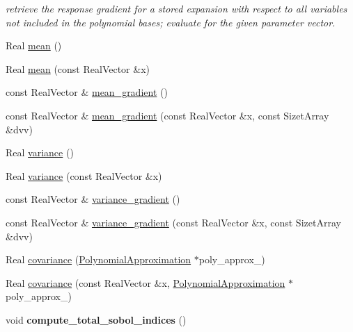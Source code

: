 \begin{DoxyCompactItemize}
\begin{DoxyCompactList}\small\item\em retrieve the response gradient for a stored expansion with respect to all variables not included in the polynomial bases; evaluate for the given parameter vector. \end{DoxyCompactList}\item 
Real \hyperlink{classPecos_1_1NodalInterpPolyApproximation_adc6f262952d05a33ff68cae37929cbb2}{mean} ()
\item 
Real \hyperlink{classPecos_1_1NodalInterpPolyApproximation_aed107df248a4555c052446fbc10a8e61}{mean} (const Real\+Vector \&x)
\item 
const Real\+Vector \& \hyperlink{classPecos_1_1NodalInterpPolyApproximation_a069c87a26fdb4b09af68db26abd646a0}{mean\+\_\+gradient} ()
\item 
const Real\+Vector \& \hyperlink{classPecos_1_1NodalInterpPolyApproximation_a24f2edc21c9887121cda78faae1c1475}{mean\+\_\+gradient} (const Real\+Vector \&x, const Sizet\+Array \&dvv)
\item 
Real \hyperlink{classPecos_1_1NodalInterpPolyApproximation_a38f6da77468be17e02ce38af2c0976c3}{variance} ()
\item 
Real \hyperlink{classPecos_1_1NodalInterpPolyApproximation_acbdcb523a161d7d3a5cc190796e84ede}{variance} (const Real\+Vector \&x)
\item 
const Real\+Vector \& \hyperlink{classPecos_1_1NodalInterpPolyApproximation_ae898fc2f42f1077268f89fc2e9f2c71c}{variance\+\_\+gradient} ()
\item 
const Real\+Vector \& \hyperlink{classPecos_1_1NodalInterpPolyApproximation_a791e127a445f8a6c9c3a7966d12c1431}{variance\+\_\+gradient} (const Real\+Vector \&x, const Sizet\+Array \&dvv)
\item 
Real \hyperlink{classPecos_1_1NodalInterpPolyApproximation_ac0085912d4abb9caa3f480b9c6778c0e}{covariance} (\hyperlink{classPecos_1_1PolynomialApproximation}{Polynomial\+Approximation} $\ast$poly\+\_\+approx\+\_)
\item 
Real \hyperlink{classPecos_1_1NodalInterpPolyApproximation_afc1731a3d89818d49c03a3c20a7a2898}{covariance} (const Real\+Vector \&x, \hyperlink{classPecos_1_1PolynomialApproximation}{Polynomial\+Approximation} $\ast$poly\+\_\+approx\+\_)
\item 
void {\bfseries compute\+\_\+total\+\_\+sobol\+\_\+indices} ()\label{classPecos_1_1NodalInterpPolyApproximation_a9b445d773d12ed85eb56bb73f6d7e540}


\end{DoxyCompactItemize}
